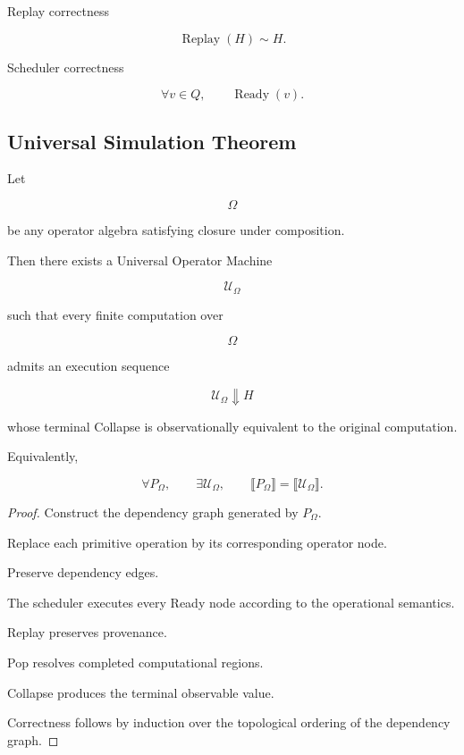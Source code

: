 \documentclass[12pt,oneside]{article}
\theoremstyle{definition}
\theoremstyle{remark}
\begin{document}
Replay correctness

\[
\operatorname{Replay}
(H)
\sim
H.
\]

Scheduler correctness

\[
\forall
v
\in
Q,
\qquad
\operatorname{Ready}(v).
\]

\subsection*{Universal Simulation Theorem}

Let

\[
\Omega
\]

be any operator algebra satisfying closure under composition.

Then there exists a Universal Operator Machine

\[
\mathcal U_\Omega
\]

such that every finite computation over

\[
\Omega
\]

admits an execution sequence

\[
\mathcal U_\Omega
\Downarrow
H
\]

whose terminal Collapse is observationally equivalent to the original computation.

Equivalently,

\[
\forall
P_\Omega,
\qquad
\exists
\mathcal U_\Omega,
\qquad
\llbracket
P_\Omega
\rrbracket
=
\llbracket
\mathcal U_\Omega
\rrbracket.
\]

\begin{proof}

Construct the dependency graph generated by
\(P_\Omega\).

Replace each primitive operation by its corresponding operator node.

Preserve dependency edges.

The scheduler executes every Ready node according to the operational semantics.

Replay preserves provenance.

Pop resolves completed computational regions.

Collapse produces the terminal observable value.

Correctness follows by induction over the topological ordering of the dependency graph.

\end{proof}
\end{document}
